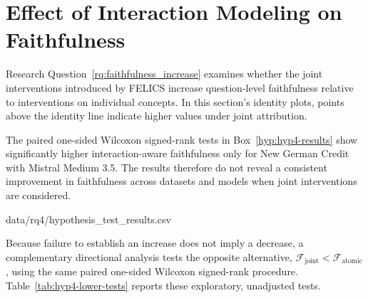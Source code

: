 \section{Effect of Interaction Modeling on Faithfulness}
\label{sec:results-faithfulness-increase}

Research Question~\ref{rq:faithfulness_increase} examines whether the joint interventions introduced by FELICS increase question-level faithfulness relative to interventions on individual concepts. In this section's identity plots, points above the identity line indicate higher values under joint attribution.

The paired one-sided Wilcoxon signed-rank tests in Box~\ref{hyp:hyp4-results} show significantly higher interaction-aware faithfulness only for New German Credit with Mistral Medium 3.5. The results therefore do not reveal a consistent improvement in faithfulness across datasets and models when joint interventions are considered.

  {data/rq4/hypothesis_test_results.csv}

Because failure to establish an increase does not imply a decrease, a
complementary directional analysis tests the opposite alternative,
$\mathcal{F}_{\mathrm{joint}}<\mathcal{F}_{\mathrm{atomic}}$, using the same
paired one-sided Wilcoxon signed-rank procedure. Table~\ref{tab:hyp4-lower-tests}
reports these exploratory, unadjusted tests.

